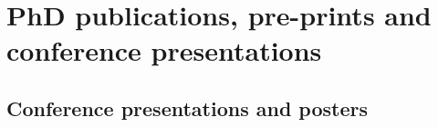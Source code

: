 \chapter{PhD publications, pre-prints and conference presentations}\label{sec:publications}

\begin{spacing}{0.9}

    \begin{refsection}
        \nocite{Kirwan2024-hj, Kirwan2022-za, Kirwan2022-ka, Kirwan2021-yl}
        \printbibliography[title={First-author peer-reviewed publications}, heading=subbibliography]
    \end{refsection}

    \begin{refsection}
        \nocite{Brizzi2019-yj, Hall2021-rh, Mulchandani2020-en, Allen2021-jo, Brizzi2021-zl, Docherty2021-es, Presanis2021-pv, Pantazis2021-dv, Brown2022-mn, Hall2022-ep, Wallace2022-vs, Jackson2022-lt, Hall2024-ai}
        \printbibliography[title={Contributing author peer-reviewed publications}, heading=subbibliography]
    \end{refsection}

    \begin{refsection}
        \nocite{Kirwan2021-sw}
        \printbibliography[title={First-author pre-prints}, heading=subbibliography]
    \end{refsection}

    \section*{Conference presentations and posters}


\end{spacing}
